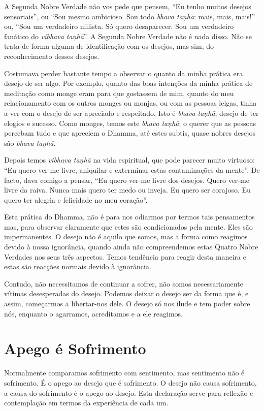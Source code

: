 A Segunda Nobre Verdade não vos pede que pensem, “Eu tenho muitos desejos
sensoriais”, ou “Sou mesmo ambicioso. Sou todo \emph{bhava taṇhā}: mais, mais,
mais!” ou, “Sou um verdadeiro niilista. Só quero desaparecer. Sou um verdadeiro
fanático do \emph{vibhava taṇhā}”. A Segunda Nobre Verdade não é nada disso. Não
se trata de forma alguma de identificação com os desejos, mas sim, do
reconhecimento desses desejos.

Costumava perder bastante tempo a observar o quanto da minha prática era desejo
de ser algo. Por exemplo, quanto das boas intenções da minha prática de
meditação como monge eram para que gostassem de mim, quanto do meu
relacionamento com os outros monges ou monjas, ou com as pessoas leigas, tinha a
ver com o desejo de ser apreciado e respeitado. Isto é \emph{bhava taṇhā},
desejo de ter elogios e sucesso. Como monges, temos este \emph{bhava taṇhā}; o
querer que as pessoas percebam tudo e que apreciem o Dhamma, até estes subtis,
quase nobres desejos são \emph{bhava taṇhā}.

Depois temos \emph{vibhava taṇhā} na vida espiritual, que pode parecer muito
virtuoso: “Eu quero ver-me livre, aniquilar e exterminar estas contaminações da
mente”. De facto, dava comigo a pensar, “Eu quero ver-me livre dos desejos.
Quero ver-me livre da raiva. Nunca mais quero ter medo ou inveja. Eu quero ser
corajoso. Eu quero ter alegria e felicidade no meu coração”.

Esta prática do Dhamma, não é para nos odiarmos por termos tais pensamentos mas,
para observar claramente que estes são condicionados pela mente. Eles são
impermanentes. O desejo não é aquilo que somos, mas a forma como reagimos devido
à nossa ignorância, quando ainda não compreendemos estas Quatro Nobre Verdades
nos seus três aspectos. Temos tendência para reagir desta maneira e estas são
reacções normais devido à ignorância.

Contudo, não necessitamos de continuar a sofrer, não somos necessariamente
vítimas desesperadas do desejo. Podemos deixar o desejo ser da forma que é, e
assim, começarmos a libertar-nos dele. O desejo só nos ilude e tem poder sobre
nós, enquanto o agarramos, acreditamos e a ele reagimos.

\section{Apego é Sofrimento}

Normalmente comparamos sofrimento com sentimento, mas sentimento não é
sofrimento. É o apego ao desejo que é sofrimento. O desejo não causa sofrimento,
a causa do sofrimento é o apego ao desejo. Esta declaração serve para reflexão e
contemplação em termos da experiência de cada um.

